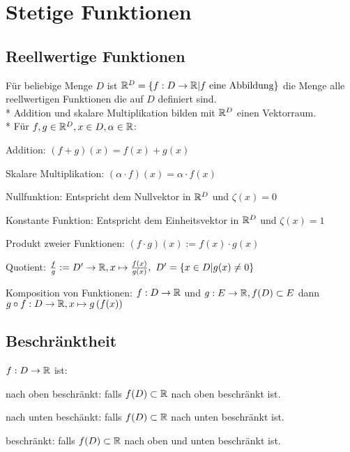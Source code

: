
\section{Stetige Funktionen}
\subsection{Reellwertige Funktionen}
Für beliebige Menge $D$ ist $\mathbb{R}^D = \{f : D \to \mathbb{R} | f \text{ eine Abbildung}\}$ die Menge alle reellwertigen Funktionen die auf $D$ definiert sind.\\*
Addition und skalare Multiplikation bilden mit $\mathbb{R}^D$ einen Vektorraum.\\*
Für $f, g \in \mathbb{R}^D, x \in D, \alpha \in \mathbb{R}$:
\begin{compactdesc}
    \item[Addition:] $(f + g)(x) = f(x) + g(x)$
    \item[Skalare Multiplikation:] $\left( \alpha \cdot f \right) (x) = \alpha \cdot f(x)$
    \item[Nullfunktion:] Entspricht dem Nullvektor in $\mathbb{R}^D$ und $\zeta(x) = 0$
    \item[Konstante Funktion:]  Entspricht dem Einheitsvektor in $\mathbb{R}^D$ und $\zeta(x) = 1$
    \item[Produkt zweier Funktionen:] $(f \cdot g)(x) := f(x) \cdot g(x)$
    \item[Quotient:] $\frac{f}{g} := D' \to \mathbb{R}, x \mapsto \frac{f(x)}{g(x)}, \ D'= \{x \in D | g(x) \neq 0\} $
    \item[Komposition von Funktionen:] $f: D \to \mathbb{R}$ und $g: E \to \mathbb{R}, f(D) \subset E$ dann $g \circ f: D \to \mathbb{R}, x \mapsto g\left( f(x) \right)$
\end{compactdesc}

\subsection{Beschränktheit}
$f : D \to \mathbb{R}$ ist:
\begin{compactdesc}
    \item[nach oben beschränkt:] falls $f(D) \subset \mathbb{R}$ nach oben beschränkt ist.
    \item[nach unten beschänkt:] falls $f(D) \subset \mathbb{R}$ nach unten beschränkt ist.
    \item[beschränkt:] falls $f(D) \subset \mathbb{R}$ nach oben und unten beschränkt ist.
\end{compactdesc}

